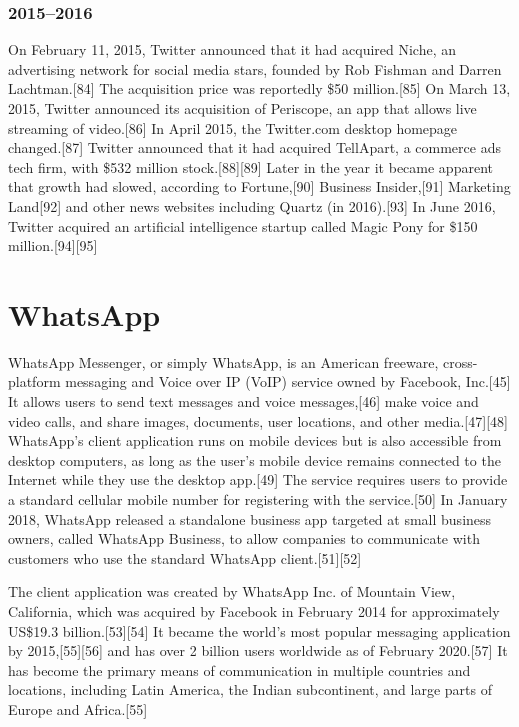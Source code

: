 \documentclass[12pt]{article}
\begin{document}
\subsubsection{2015–2016}




On February 11, 2015, Twitter announced that it had acquired Niche, an advertising network for social media stars, founded by Rob Fishman and Darren Lachtman.[84] The acquisition price was reportedly \$50 million.[85] On March 13, 2015, Twitter announced its acquisition of Periscope, an app that allows live streaming of video.[86] In April 2015, the Twitter.com desktop homepage changed.[87] Twitter announced that it had acquired TellApart, a commerce ads tech firm, with \$532 million stock.[88][89] Later in the year it became apparent that growth had slowed, according to Fortune,[90] Business Insider,[91] Marketing Land[92] and other news websites including Quartz (in 2016).[93] In June 2016, Twitter acquired an artificial intelligence startup called Magic Pony for \$150 million.[94][95]








\section{WhatsApp}




WhatsApp Messenger, or simply WhatsApp, is an American freeware, cross-platform messaging and Voice over IP (VoIP) service owned by Facebook, Inc.[45] It allows users to send text messages and voice messages,[46] make voice and video calls, and share images, documents, user locations, and other media.[47][48] WhatsApp's client application runs on mobile devices but is also accessible from desktop computers, as long as the user's mobile device remains connected to the Internet while they use the desktop app.[49] The service requires users to provide a standard cellular mobile number for registering with the service.[50] In January 2018, WhatsApp released a standalone business app targeted at small business owners, called WhatsApp Business, to allow companies to communicate with customers who use the standard WhatsApp client.[51][52]

The client application was created by WhatsApp Inc. of Mountain View, California, which was acquired by Facebook in February 2014 for approximately US\$19.3 billion.[53][54] It became the world's most popular messaging application by 2015,[55][56] and has over 2 billion users worldwide as of February 2020.[57] It has become the primary means of communication in multiple countries and locations, including Latin America, the Indian subcontinent, and large parts of Europe and Africa.[55] 
\end{document}
